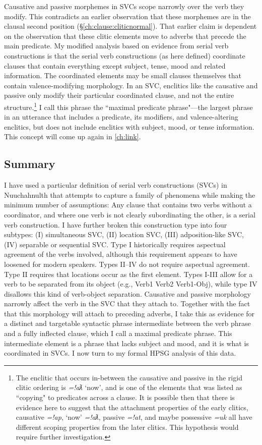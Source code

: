 Causative and passive morphemes in SVCs scope narrowly over the verb they modify. This contradicts an earlier observation that these morphemes are in the clausal second position (\S\ref{ch:clause:cliticnormal}). That earlier claim is dependent on the observation that these clitic elements move to adverbs that precede the main predicate. My modified analysis based on evidence from serial verb constructions is that the serial verb constructions (as here defined) coordinate clauses that contain everything except subject, tense, mood and related information. The coordinated elements may be small clauses themselves that contain valence-modifying morphology. In an SVC, enclitics like the causative and passive only modify their particular coordinated clause, and not the entire structure.\footnote{The enclitic that occurs in-between the causative and passive in the rigid clitic ordering is \textit{=!aƛ} `now', and is one of the elements that was listed as ``copying" to predicates across a clause. It is possible then that there is evidence here to suggest that the attachment properties of the early clitics, causative \textit{=!ap}, `now' \textit{=!aƛ}, passive \textit{=!at}, and maybe possessive \textit{=uk} all have different scoping properties from the later clitics. This hypothesis would require further investigation.} I call this phrase the ``maximal predicate phrase"---the largest phrase in an utterance that includes a predicate, its modifiers, and valence-altering enclitics, but does not include enclitics with subject, mood, or tense information. This concept will come up again in \cref{ch:link}.

\subsection{Summary}

I have used a particular definition of serial verb constructions (SVCs) in Nuuchahnulth that attempts to capture a family of phenomena while making the minimum number of assumptions: Any clause that contains two verbs without a coordinator, and where one verb is not clearly subordinating the other, is a serial verb construction. I have further broken this construction type into four subtypes: (I) simultaneous SVC, (II) location SVC, (III) adposition-like SVC, (IV) separable or sequential SVC. Type I historically requires aspectual agreement of the verbs involved, although this requirement appears to have loosened for modern speakers. Types II--IV do not require aspectual agreement. Type II requires that locations occur as the first element. Types I-III allow for a verb to be separated from its object (e.g., Verb1 Verb2 Verb1-Obj), while type IV disallows this kind of verb-object separation. Causative and passive morphology narrowly affect the verb in the SVC that they attach to. Together with the fact that this morphology will attach to preceding adverbs, I take this as evidence for a distinct and targetable syntactic phrase intermediate between the verb phrase and a fully inflected clause, which I call a maximal predicate phrase. This intermediate element is a phrase that lacks subject and mood, and it is what is coordinated in SVCs. I now turn to my formal HPSG analysis of this data.

